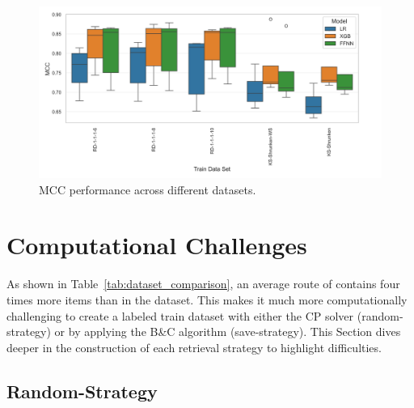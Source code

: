 \begin{figure}[!ht]
	\centering
	\includegraphics[width = \textwidth]{pictures/krebs_results/krebs_mcc_across_DS.png}
	\caption{MCC performance across different \krebsADataSetText datasets.}
	\label{fig:krebs_performance_datasets}
\end{figure}

\chapter{\krebsADataSetText Computational Challenges}
\label{app:sec:krebs_computationally_challenges}

As shown in Table~\ref{tab:dataset_comparison}, an average route of \krebsADataSetText contains four times more items than
in the \gendreauDataSetText dataset. This makes it much more computationally challenging to create a labeled train dataset with either
the \gls{CP} solver (random-strategy) or by applying the B\&C algorithm (save-strategy). This Section dives deeper in
the construction of each retrieval strategy to highlight difficulties.

\section{Random-Strategy}
\label{sec:challenges_krebs_random}

